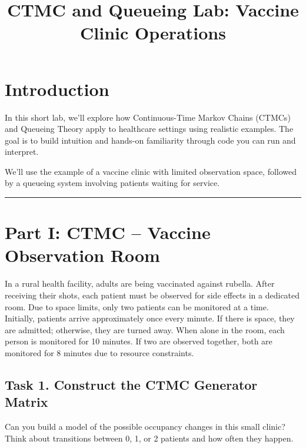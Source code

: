 \documentclass[
]{article}
\title{CTMC and Queueing Lab: Vaccine Clinic Operations}
\author{}
\date{}
\renewcommand*\contentsname{Table of contents}
\newcommand\contentsname{Table of contents}
\begin{document}
\maketitle

\renewcommand*\contentsname{Table of contents}
{
\hypersetup{linkcolor=}
\setcounter{tocdepth}{3}
\tableofcontents
}

\section{Introduction}\label{introduction}

In this short lab, we'll explore how Continuous-Time Markov Chains
(CTMCs) and Queueing Theory apply to healthcare settings using realistic
examples. The goal is to build intuition and hands-on familiarity
through code you can run and interpret.

We'll use the example of a vaccine clinic with limited observation
space, followed by a queueing system involving patients waiting for
service.

\begin{center}\rule{0.5\linewidth}{0.5pt}\end{center}

\section{Part I: CTMC -- Vaccine Observation
Room}\label{part-i-ctmc-vaccine-observation-room}

In a rural health facility, adults are being vaccinated against rubella.
After receiving their shots, each patient must be observed for side
effects in a dedicated room. Due to space limits, only two patients can
be monitored at a time. Initially, patients arrive approximately once
every minute. If there is space, they are admitted; otherwise, they are
turned away. When alone in the room, each person is monitored for 10
minutes. If two are observed together, both are monitored for 8 minutes
due to resource constraints.

\subsection{Task 1. Construct the CTMC Generator
Matrix}\label{task-1.-construct-the-ctmc-generator-matrix}

Can you build a model of the possible occupancy changes in this small
clinic? Think about transitions between 0, 1, or 2 patients and how
often they happen.
\end{document}
